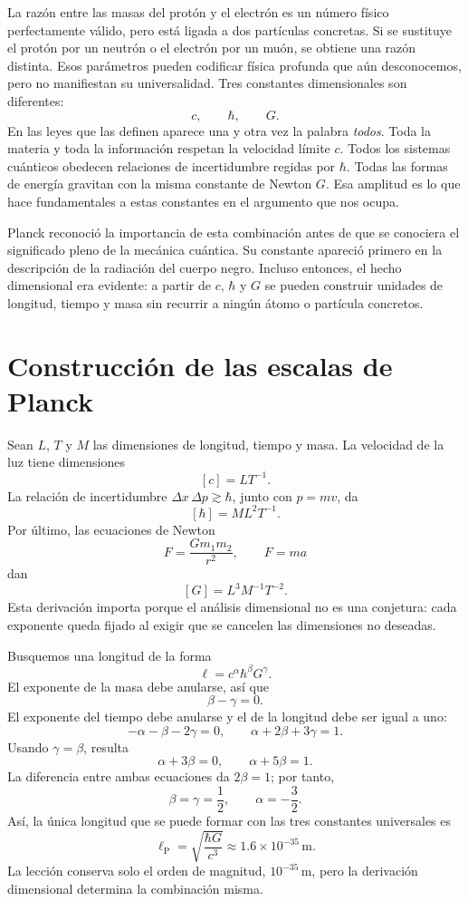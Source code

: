 La razón entre las masas del protón y el electrón es un número físico perfectamente válido, pero está ligada a dos partículas concretas. Si se sustituye el protón por un neutrón o el electrón por un muón, se obtiene una razón distinta. Esos parámetros pueden codificar física profunda que aún desconocemos, pero no manifiestan su universalidad. Tres constantes dimensionales son diferentes:
\[
c,\qquad \hbar,\qquad G.
\]
En las leyes que las definen aparece una y otra vez la palabra \emph{todos}. Toda la materia y toda la información respetan la velocidad límite \(c\). Todos los sistemas cuánticos obedecen relaciones de incertidumbre regidas por \(\hbar\). Todas las formas de energía gravitan con la misma constante de Newton \(G\). Esa amplitud es lo que hace fundamentales a estas constantes en el argumento que nos ocupa.

Planck reconoció la importancia de esta combinación antes de que se conociera el significado pleno de la mecánica cuántica. Su constante apareció primero en la descripción de la radiación del cuerpo negro. Incluso entonces, el hecho dimensional era evidente: a partir de \(c\), \(\hbar\) y \(G\) se pueden construir unidades de longitud, tiempo y masa sin recurrir a ningún átomo o partícula concretos.

\section{Construcción de las escalas de Planck}

Sean \(L\), \(T\) y \(M\) las dimensiones de longitud, tiempo y masa. La velocidad de la luz tiene dimensiones
\[
[c]=LT^{-1}.
\]
La relación de incertidumbre \(\Delta x\,\Delta p\gtrsim\hbar\), junto con \(p=mv\), da
\[
[\hbar]=ML^2T^{-1}.
\]
Por último, las ecuaciones de Newton
\[
F=\frac{Gm_1m_2}{r^2},
\qquad
F=ma
\]
dan
\[
[G]=L^3M^{-1}T^{-2}.
\]
Esta derivación importa porque el análisis dimensional no es una conjetura: cada exponente queda fijado al exigir que se cancelen las dimensiones no deseadas.

Busquemos una longitud de la forma
\begin{equation}
\ell=c^\alpha\hbar^\beta G^\gamma.
\label{eq:c10-length-ansatz}
\end{equation}
El exponente de la masa debe anularse, así que
\[
\beta-\gamma=0.
\]
El exponente del tiempo debe anularse y el de la longitud debe ser igual a uno:
\[
-\alpha-\beta-2\gamma=0,
\qquad
\alpha+2\beta+3\gamma=1.
\]
Usando \(\gamma=\beta\), resulta
\[
\alpha+3\beta=0,
\qquad
\alpha+5\beta=1.
\]
La diferencia entre ambas ecuaciones da \(2\beta=1\); por tanto,
\[
\beta=\gamma=\frac12,
\qquad
\alpha=-\frac32.
\]
Así, la única longitud que se puede formar con las tres constantes universales es
\begin{equation}
\ell_{\mathrm P}
=\sqrt{\frac{\hbar G}{c^3}}
\approx 1.6\times10^{-35}\,\mathrm m.
\label{eq:c10-planck-length}
\end{equation}
La lección conserva solo el orden de magnitud, \(10^{-35}\,\mathrm m\), pero la derivación dimensional determina la combinación misma.

